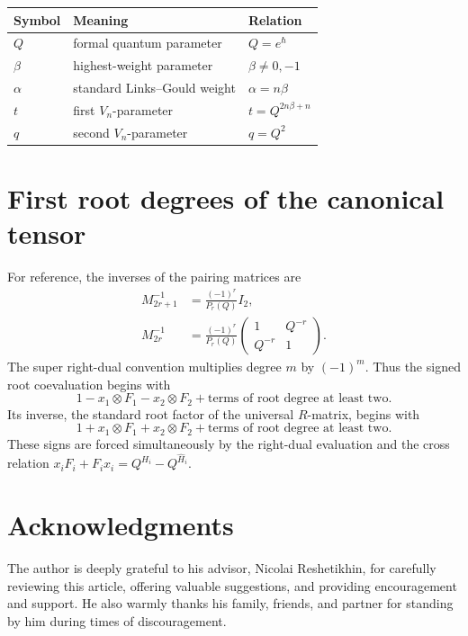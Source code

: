 \documentclass[11pt,a4paper]{article}
\newcommand{\ot}{\otimes}
\theoremstyle{definition}
\theoremstyle{remark}
\begin{document}
\begin{center}
\begin{tabular}{@{}lll@{}}
\toprule
Symbol & Meaning & Relation\\
\midrule
\(Q\) & formal quantum parameter & \(Q=e^\hbar\)\\
\(\beta\) & highest-weight parameter & \(\beta\neq0,-1\)\\
\(\alpha\) & standard Links--Gould weight & \(\alpha=n\beta\)\\
\(t\) & first \(V_n\)-parameter & \(t=Q^{2n\beta+n}\)\\
\(q\) & second \(V_n\)-parameter & \(q=Q^2\)\\
\bottomrule
\end{tabular}
\end{center}

\section{First root degrees of the canonical tensor}

For reference, the inverses of the pairing matrices are
\[
\begin{aligned}
 M_{2r+1}^{-1}&=\frac{(-1)^r}{P_r(Q)}I_2,\\
 M_{2r}^{-1}&=\frac{(-1)^r}{P_r(Q)}
 \begin{pmatrix}1&Q^{-r}\\Q^{-r}&1\end{pmatrix}.
\end{aligned}
\]
The super right-dual convention multiplies degree \(m\) by \((-1)^m\).
Thus the signed root coevaluation begins with
\[
 1-x_1\ot F_1-x_2\ot F_2+\text{terms of root degree at least two}.
\]
Its inverse, the standard root factor of the universal \(R\)-matrix,
begins with
\[
 1+x_1\ot F_1+x_2\ot F_2+\text{terms of root degree at least two}.
\]
These signs are forced simultaneously by the right-dual evaluation and
the cross relation \(x_iF_i+F_ix_i=Q^{H_i}-Q^{\widehat H_i}\).

\section*{Acknowledgments}
{}

The author is deeply grateful to his advisor, Nicolai Reshetikhin, for
carefully reviewing this article, offering valuable suggestions, and providing
encouragement and support.  He also warmly thanks his family, friends, and
partner for standing by him during times of discouragement.
\end{document}
